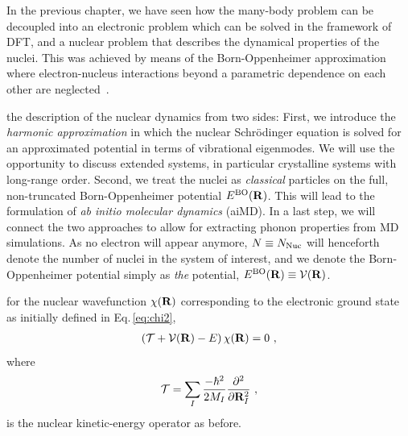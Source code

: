 In the previous chapter, we have seen how the many-body problem can be decoupled into an electronic problem %
which can be solved in the framework of DFT, and a nuclear problem %
that describes the dynamical properties of the nuclei. This was achieved by means of the Born-Oppenheimer approximation where electron-nucleus interactions beyond a parametric dependence on each other are neglected~\cite{BornOppenheimer}.

 the description of the nuclear dynamics from two sides: First, we introduce the \emph{harmonic approximation} in which the nuclear Schr\"odinger equation is solved for an approximated potential in terms of vibrational eigenmodes. We will use the opportunity to discuss extended systems, in particular crystalline systems with long-range order.
Second, we treat the nuclei as \emph{classical} particles on the full, non-truncated Born-Oppenheimer potential $E^{\rm BO} ({\bf R})$. This will lead to the formulation of \emph{ab initio molecular dynamics} (aiMD). In a last step, we will connect the two approaches to allow for extracting phonon properties from MD simulations.
As no electron will appear anymore, $N \equiv N_{\rm Nuc}$ will henceforth denote the number of nuclei in the system of interest, and we denote the Born-Oppenheimer potential simply as \emph{the} potential, $E^{\rm BO} ({\bf R}) \equiv \mathcal V ({\bf R})$.

 for the nuclear wavefunction $\chi ({\bf R})$ corresponding to the electronic ground state as initially defined in Eq.\,\eqref{eq:chi2},
\begin{align}
\left( \mathcal T + \mathcal V ({\bf R}) - E \right) \chi ({\bf R})
= 0~,
\label{eq:BOSE}
\end{align}
where
\begin{align}
\mathcal  T
= \sum_I \frac{- \hbar^2}{2 M_I} \frac{\partial^2}{\partial {\bf R}_I^2}~,
\label{eq:Tnuc2}
\end{align}
is the nuclear kinetic-energy operator as before.

\newpage
